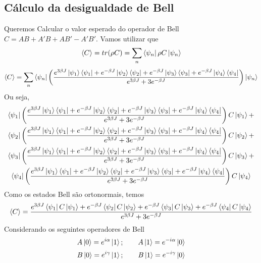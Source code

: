 \documentclass[
12pt,				%
openright,			%
oneside,			%
a4paper,			%
english,			%
french,				%
spanish,			%
brazil				%
]{abntex2}
\begin{document}
\subsection{Cálculo da desigualdade de Bell}
Queremos Calcular o valor esperado do operador de Bell $C=AB+A'B+AB'-A'B'$. Vamos utilizar que 
\begin{equation}
	\langle C \rangle =tr(\rho C)=\sum_n \bra{\psi_n}\rho C\ket{\psi_n}
\end{equation}
 \begin{equation}
 	\langle C \rangle =\sum_n \bra{\psi_n}\left(\frac{e^{3\beta J}\ket{\psi_1}\bra{\psi_1}+e^{-\beta J}\ket{\psi_2}\bra{\psi_2}+e^{-\beta J}\ket{\psi_3}\bra{\psi_3}+e^{-\beta J}\ket{\psi_4}\bra{\psi_4}}{e^{3\beta J}+3e^{-\beta J}}\right) \ket{\psi_n}
 \end{equation}
 Ou seja,
 \begin{multline}
 	\bra{\psi_1}\left(\frac{e^{3\beta J}\ket{\psi_1}\bra{\psi_1}+e^{-\beta J}\ket{\psi_2}\bra{\psi_2}+e^{-\beta J}\ket{\psi_3}\bra{\psi_3}+e^{-\beta J}\ket{\psi_4}\bra{\psi_4}}{e^{3\beta J}+3e^{-\beta J}}\right) C \ket{\psi_1} +\\
 	\bra{\psi_2}\left(\frac{e^{3\beta J}\ket{\psi_1}\bra{\psi_1}+e^{-\beta J}\ket{\psi_2}\bra{\psi_2}+e^{-\beta J}\ket{\psi_3}\bra{\psi_3}+e^{-\beta J}\ket{\psi_4}\bra{\psi_4}}{e^{3\beta J}+3e^{-\beta J}}\right) C \ket{\psi_2}+\\
 	\bra{\psi_3}\left(\frac{e^{3\beta J}\ket{\psi_1}\bra{\psi_1}+e^{-\beta J}\ket{\psi_2}\bra{\psi_2}+e^{-\beta J}\ket{\psi_3}\bra{\psi_3}+e^{-\beta J}\ket{\psi_4}\bra{\psi_4}}{e^{3\beta J}+3e^{-\beta J}}\right) C \ket{\psi_3}+ \\
 	\bra{\psi_4}\left(\frac{e^{3\beta J}\ket{\psi_1}\bra{\psi_1}+e^{-\beta J}\ket{\psi_2}\bra{\psi_2}+e^{-\beta J}\ket{\psi_3}\bra{\psi_3}+e^{-\beta J}\ket{\psi_4}\bra{\psi_4}}{e^{3\beta J}+3e^{-\beta J}}\right) C \ket{\psi_4}
 	\end{multline}
Como os estados Bell são ortonormais, temos 
\begin{equation}
\langle C \rangle=\frac{e^{3\beta J}\bra{\psi_1}C\ket{\psi_1}+e^{-\beta J}\bra{\psi_2}C\ket{\psi_2}+e^{-\beta J}\bra{\psi_3}C\ket{\psi_3}+e^{-\beta J}\bra{\psi_4}C\ket{\psi_4}}{e^{3\beta J}+3e^{-\beta J}}
\end{equation}
Considerando os seguintes operadores de Bell
\begin{equation}
	A\ket{0}=e^{i\alpha}\ket{1}; \qquad A\ket{1}=e^{-i\alpha}\ket{0} 
\end{equation}
\begin{equation}
	B\ket{0}=e^{i\gamma}\ket{1}; \qquad B\ket{1}=e^{-i\gamma}\ket{0} 
\end{equation}
\end{document}

